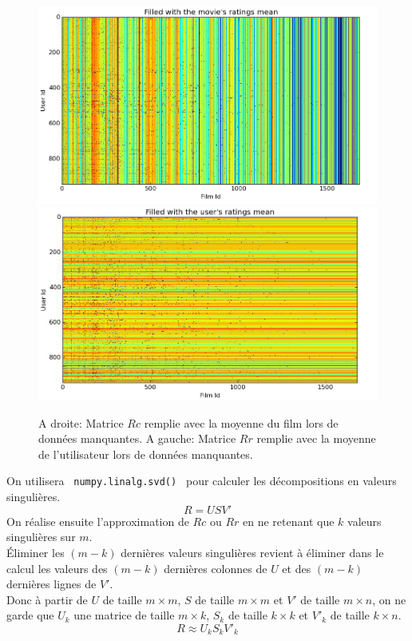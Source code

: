 \documentclass[12pt,a4paper]{article}
\begin{document}
\begin{figure}[h!]
	\includegraphics[scale=0.28]{R-Filled-By-Movie.png}
	\includegraphics[scale=0.28]{R-Filled-By-User.png}
	\caption{A droite: Matrice $Rc$ remplie avec la moyenne du film lors de données manquantes. A gauche: Matrice $Rr$ remplie avec la moyenne de l'utilisateur lors de données manquantes.}
\end{figure}

On utilisera \texttt{ numpy.linalg.svd() } pour calculer les décompositions en valeurs singulières. $$R=USV'$$On réalise ensuite l'approximation de $Rc$ ou $Rr$ en ne retenant que $k$ valeurs singulières sur $m$.\\ Éliminer les $(m-k)$ dernières valeurs singulières revient à éliminer dans le calcul les valeurs des $(m-k)$ dernières colonnes de $U$ et des $(m-k)$ dernières lignes de $V'$.\\
Donc à partir de $U$ de taille $m\times m$, $S$ de taille $m \times m$ et $V'$ de taille $m \times n$, on ne garde que $U_k$ une matrice de taille $m \times k$, $S_k$ de taille $k \times k$ et $V'_k$ de taille $k \times n$.
$$R \approx U_kS_kV'_k$$
\end{document}

